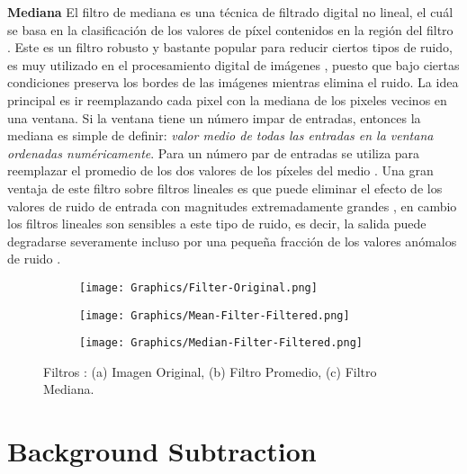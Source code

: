 \textbf{Mediana}
El filtro de mediana es una técnica de filtrado digital no lineal, el cuál se basa en la clasificación de los valores de píxel contenidos en la región del filtro \cite{MandarMeghana}. Este es un filtro robusto y bastante popular para reducir ciertos tipos de ruido, es muy utilizado en el procesamiento digital de imágenes \cite{RuchikaGaurav}, puesto que bajo ciertas condiciones preserva los bordes de las imágenes mientras elimina el ruido. La idea principal es ir reemplazando cada pixel con la mediana de los pixeles vecinos en una ventana. Si la ventana tiene un número impar de entradas, entonces la mediana es simple de definir: \textit{valor medio de todas las entradas en la ventana ordenadas numéricamente}. Para un número par de entradas se utiliza para reemplazar el promedio de los dos valores de los píxeles del medio \cite{PawanManojSumitAshok}. Una gran ventaja de este filtro sobre filtros lineales es que puede eliminar el efecto de los valores de ruido de entrada con magnitudes extremadamente grandes \cite{MandarMeghana}, en cambio los filtros lineales son sensibles a este tipo de ruido, es decir, la salida puede degradarse severamente incluso por una pequeña fracción de los valores anómalos de ruido \cite{JamesYixinStephen, PawanManojSumitAshok}.

\begin{figure}[h!]
    \centering
    \begin{subfigure}[b]{0.32\linewidth}
        \centering
	    \texttt{[image: Graphics/Filter-Original.png]}
        \caption{}
    \end{subfigure}
    \begin{subfigure}[b]{0.32\linewidth}
        \centering
	    \texttt{[image: Graphics/Mean-Filter-Filtered.png]}
        \caption{}
    \end{subfigure}    
    \begin{subfigure}[b]{0.32\linewidth}
        \centering
	    \texttt{[image: Graphics/Median-Filter-Filtered.png]}
        \caption{}
    \end{subfigure}    
    \caption{Filtros : (a) Imagen Original, (b) Filtro Promedio, (c) Filtro Mediana.}
    \label{fig:filters}
\end{figure}    

\section{Background Subtraction}\label{sec:BS}

